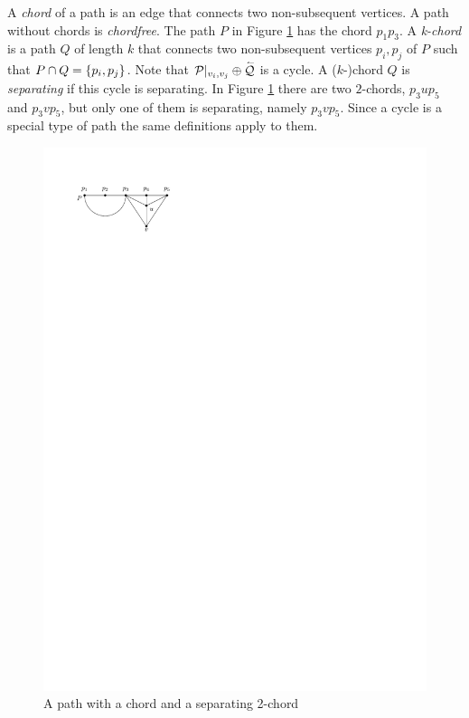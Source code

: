     A \emph{chord} of a path is an edge that connects two non-subsequent vertices. A path without chords is \emph{chordfree}. The path $P$ in Figure \ref{fig:right:chord} has the chord $p_1 p_3$.
    A \emph{k-chord} is a path $Q$ of length $k$ that connects two non-subsequent vertices $p_i, p_j$ of $P$ such that $P \cap Q = \left\lbrace {p_i, p_j} \right\rbrace$.
    Note that $\mathcal{P}|_{v_i, v_j} \oplus \accentset{\leftharpoonup}{\mathcal{Q}}$ is a cycle.
    A ($k$-)chord $Q$ is \emph{separating} if this cycle is separating. In Figure \ref{fig:right:chord} there are two $2$-chords, $p_3 u p_5$ and $p_3 v p_5$, but only one of them is separating, namely $p_3 v p_5$.
    Since a cycle is a special type of path the same definitions apply to them.

    \begin{figure}[h]
      \centering
      \includegraphics[scale=1]{unifiedAlgo/img/rightNeighbourwalk/chords.pdf}
      \caption{A path with a chord and a separating 2-chord}
      \label{fig:right:chord}
    \end{figure}

